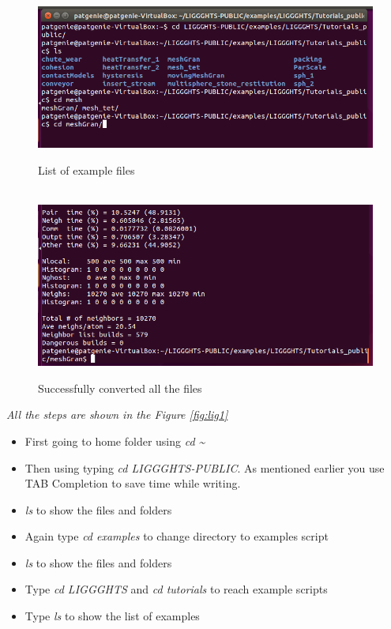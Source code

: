 \documentclass{tufte-book} %
\begin{document}
\begin{figure}
  \includegraphics[width=\linewidth]{graphics/Screenshot/Lig8.png}
  \caption[-14ex]{List of example files}
  \\\vspace{\baselineskip}
\includegraphics[width=\linewidth]{graphics/Screenshot/Lig13.png}
  \caption[-14ex]{Successfully converted all the files}
  \label{fig:lig8}
\end{figure}

\textit{All the steps are shown in the Figure \ref{fig:lig1}}
 \begin{itemize}
 \item First going to home folder using \textit{\emph{cd \~}}
 \item Then using typing \textit{\emph{cd LIGGGHTS-PUBLIC}}. As mentioned earlier you use TAB Completion to save time while writing.
 \item \textit{\emph{ls}} to show the files and folders 
 \item Again type \textit{\emph{cd examples}} to change directory to examples script
 \item \textit{\emph{ls}} to show the files and folders
 \item Type \textit{\emph{cd LIGGGHTS}} and \textit{\emph{cd tutorials}} to reach example scripts
   
 \item Type \textit{\emph{ls}} to show the list of examples
 \end{itemize}
\end{document}
